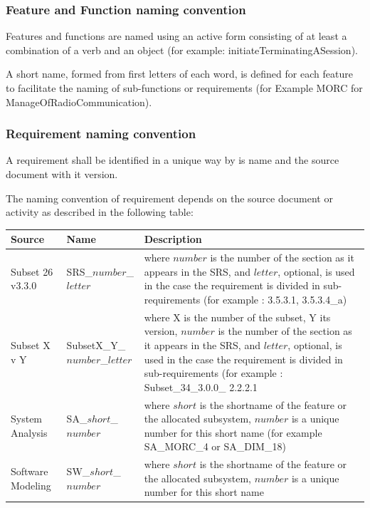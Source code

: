 \subsubsection{Feature and Function naming convention}

Features and  functions are named using an active form consisting of at least a combination of a verb and an object (for example:   initiateTerminatingASession).

A short name, formed from first letters of each word, is defined for each feature to  facilitate the naming of sub-functions or requirements (for Example MORC for ManageOfRadioCommunication). 

\subsubsection{Requirement naming convention}

A requirement shall be identified in a unique way by is name and the  source document with it version.

The naming convention of requirement depends on the source document or activity as described in the following table:

\begin{tabular}{|p{2cm} | p{4cm} | p{8cm}|}
\hline 
Source & Name & Description \\
\hline 
Subset 26 v3.3.0 & SRS\_$number$\_$letter$ & where $number$ is the number of the section as it appears in the SRS, and $letter$, optional, is used in the case the requirement is divided in sub-requirements  (for example : 3.5.3.1, 3.5.3.4\_a) \\
\hline 
Subset X v Y & SubsetX\_Y\_$number$\_$letter$ &  where X is the number of the subset, Y its version, $number$ is the number of the section as it appears in the SRS, and $letter$, optional, is used in the case the requirement is divided in sub-requirements (for example : Subset\_34\_3.0.0\_ 2.2.2.1 \\
\hline 
System Analysis & SA\_$short$\_$number$ & where $short$ is the shortname of the feature or the allocated subsystem, $number$ is a unique number for this short name (for example SA\_MORC\_4 or SA\_DIM\_18) \\
\hline 
Software Modeling & SW\_$short$\_$number$ & where $short$ is the shortname of the feature or the allocated subsystem, $number$ is a unique number for this short name \\
\hline
\end{tabular}
